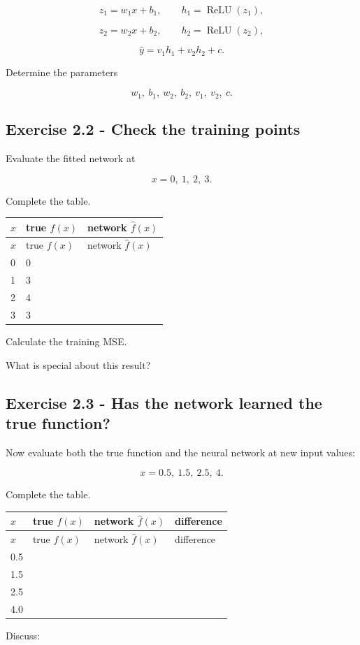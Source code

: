 \documentclass{course_sheet}
\begin{document}
\[
z_1=w_1x+b_1,
\qquad
h_1=\operatorname{ReLU}(z_1),
\]

\[
z_2=w_2x+b_2,
\qquad
h_2=\operatorname{ReLU}(z_2),
\]

\[
\hat y=v_1h_1+v_2h_2+c.
\]

Determine the parameters

\[
w_1,\ b_1,\ w_2,\ b_2,\ v_1,\ v_2,\ c.
\]

\subsection*{Exercise 2.2 - Check the training points}
Evaluate the fitted network at

\[
x=0,\ 1,\ 2,\ 3.
\]

Complete the table.

\begingroup
\small
\setlength{\tabcolsep}{4pt}
\begin{longtable}{l|l|l}
$x$ & true $f(x)$ & network $\hat f(x)$ \\[1.5pt]
\hline
\endfirsthead
$x$ & true $f(x)$ & network $\hat f(x)$ \\[1.5pt]
\hline
\endhead
\rule{0pt}{2.4ex}0 & 0 &  $\phantom{-0.00}$ \\[3pt]
\rule{0pt}{2.4ex}1 & 3 &  $\phantom{-0.00}$ \\[3pt]
\rule{0pt}{2.4ex}2 & 4 &  $\phantom{-0.00}$ \\[3pt]
\rule{0pt}{2.4ex}3 & 3 &  $\phantom{-0.00}$ \\[3pt]
\end{longtable}
\endgroup
Calculate the training MSE.

What is special about this result?

\subsection*{Exercise 2.3 - Has the network learned the true function?}
Now evaluate both the true function and the neural network at new input values:

\[
x=0.5,\ 1.5,\ 2.5,\ 4.
\]

Complete the table.

\begingroup
\small
\setlength{\tabcolsep}{4pt}
\begin{longtable}{l|l|l|l}
$x$ & true $f(x)$ & network $\hat f(x)$ & difference \\[1.5pt]
\hline
\endfirsthead
$x$ & true $f(x)$ & network $\hat f(x)$ & difference \\[1.5pt]
\hline
\endhead
\rule{0pt}{2.4ex}0.5 &  $\phantom{-0.00}$ &  $\phantom{-0.00}$ &  $\phantom{-0.00}$ \\[3pt]
\rule{0pt}{2.4ex}1.5 &  $\phantom{-0.00}$ &  $\phantom{-0.00}$ &  $\phantom{-0.00}$ \\[3pt]
\rule{0pt}{2.4ex}2.5 &  $\phantom{-0.00}$ &  $\phantom{-0.00}$ &  $\phantom{-0.00}$ \\[3pt]
\rule{0pt}{2.4ex}4.0 &  $\phantom{-0.00}$ &  $\phantom{-0.00}$ &  $\phantom{-0.00}$ \\[3pt]
\end{longtable}
\endgroup
Discuss:
\end{document}
